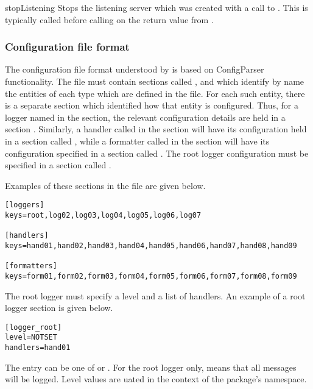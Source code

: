 \begin{funcdesc}{stopListening}{}
Stops the listening server which was created with a call to
. This is typically called before calling 
on the return value from .
\end{funcdesc}

\subsubsection{Configuration file format%
               \label{logging-config-fileformat}}

The configuration file format understood by  is
based on ConfigParser functionality. The file must contain sections
called \code{[loggers]}, \code{[handlers]} and \code{[formatters]}
which identify by name the entities of each type which are defined in
the file. For each such entity, there is a separate section which
identified how that entity is configured. Thus, for a logger named
 in the \code{[loggers]} section, the relevant
configuration details are held in a section
. Similarly, a handler called  in
the \code{[handlers]} section will have its configuration held in a
section called , while a formatter called
 in the \code{[formatters]} section will have its
configuration specified in a section called
. The root logger configuration must be
specified in a section called .

Examples of these sections in the file are given below.

\begin{verbatim}
[loggers]
keys=root,log02,log03,log04,log05,log06,log07

[handlers]
keys=hand01,hand02,hand03,hand04,hand05,hand06,hand07,hand08,hand09

[formatters]
keys=form01,form02,form03,form04,form05,form06,form07,form08,form09
\end{verbatim}

The root logger must specify a level and a list of handlers. An
example of a root logger section is given below.

\begin{verbatim}
[logger_root]
level=NOTSET
handlers=hand01
\end{verbatim}

The  entry can be one of  or . For the root logger only,
 means that all messages will be logged. Level values are
uated in the context of the  package's
namespace.

